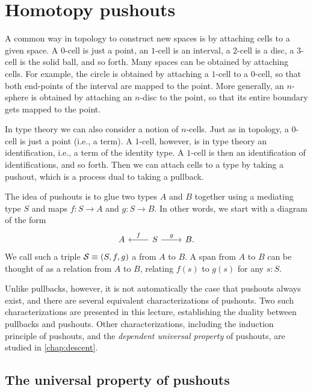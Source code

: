 \section{Homotopy pushouts}

A common way in topology to construct new spaces is by attaching cells to a given space. A $0$-cell is just a point, an $1$-cell is an interval, a $2$-cell is a disc, a $3$-cell is the solid ball, and so forth. Many spaces can be obtained by attaching cells. For example, the circle is obtained by attaching a $1$-cell to a $0$-cell, so that both end-points of the interval are mapped to the point. More generally, an $n$-sphere is obtained by attaching an $n$-disc to the point, so that its entire boundary gets mapped to the point.

In type theory we can also consider a notion of $n$-cells. Just as in topology, a $0$-cell is just a point (i.e., a term). A $1$-cell, however, is in type theory an identification, i.e., a term of the identity type. A $1$-cell is then an identification of identifications, and so forth. Then we can attach cells to a type by taking a pushout, which is a process dual to taking a pullback. 

The idea of pushouts is to glue two types $A$ and $B$ together using a mediating type $S$ and maps $f:S\to A$ and $g:S\to B$. In other words, we start with a diagram of the form
\begin{equation*}
\begin{tikzcd}
A & S \arrow[l,swap,"f"] \arrow[r,"g"] & B.
\end{tikzcd}
\end{equation*}
We call such a triple $\mathcal{S}\equiv (S,f,g)$ a  from $A$ to $B$.
A span from $A$ to $B$ can be thought of as a relation from $A$ to $B$, relating $f(s)$ to $g(s)$ for any $s:S$.

Unlike pullbacks, however, it is not automatically the case that pushouts always exist, and there are several equivalent characterizations of pushouts. Two such characterizations are presented in this lecture, establishing the duality between pullbacks and pushouts. Other characterizations, including the induction principle of pushouts, and the \emph{dependent universal property} of pushouts, are studied in \cref{chap:descent}.

\subsection{The universal property of pushouts}

